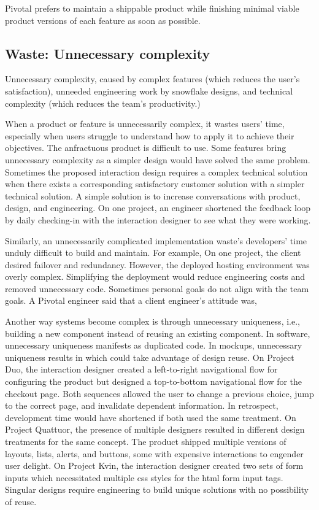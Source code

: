 Pivotal prefers to maintain a shippable product while finishing minimal viable product versions of each feature as soon as possible. 

\subsection{Waste: Unnecessary complexity}
Unnecessary complexity, caused by complex features (which reduces the user's satisfaction), unneeded engineering work by snowflake designs, and technical complexity (which reduces the team's productivity.) 

When a product or feature is unnecessarily complex, it wastes users' time, especially when users struggle to understand how to apply it to achieve their objectives. The anfractuous product is difficult to use. Some features bring unnecessary complexity as a simpler design would have solved the same problem. Sometimes the proposed interaction design requires a complex technical solution when there exists a corresponding satisfactory customer solution with a simpler technical solution. A simple solution is to increase conversations with product, design, and engineering. On one project, an engineer shortened the feedback loop by daily checking-in with the interaction designer to see what they were working.

Similarly, an unnecessarily complicated implementation waste's developers' time unduly difficult to build and maintain. For example, On one project, the client desired failover and redundancy. However, the deployed hosting environment was overly complex. Simplifying the deployment would reduce engineering costs and removed unnecessary code. Sometimes personal goals do not align with the team goals. A Pivotal engineer said that a client engineer's attitude was, 

Another way systems become complex is through unnecessary uniqueness, i.e., building a new component instead of reusing an existing component. In software, unnecessary uniqueness manifests as duplicated code. In mockups, unnecessary uniqueness results in  which could take advantage of design reuse. On Project Duo, the interaction designer created a left-to-right navigational flow for configuring the product but designed a top-to-bottom navigational flow for the checkout page. Both sequences allowed the user to change a previous choice, jump to the correct page, and invalidate dependent information. In retrospect, development time would have shortened if both used the same treatment. On Project Quattuor, the presence of multiple designers resulted in different design treatments for the same concept. The product shipped multiple versions of layouts, lists, alerts, and buttons, some with expensive interactions to engender user delight. On Project Kvin, the interaction designer created two sets of form inputs which necessitated multiple css styles for the html form input tags. Singular designs require engineering to build unique solutions with no possibility of reuse.   

